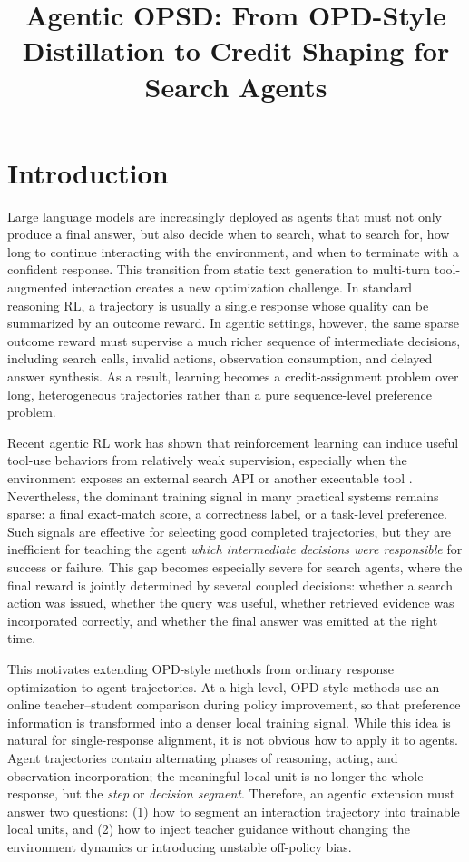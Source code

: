 \documentclass[11pt]{article}
\title{Agentic OPSD: From OPD-Style Distillation to Credit Shaping for Search Agents}
\author{}
\date{}
\begin{document}
\maketitle

\section{Introduction}
Large language models are increasingly deployed as agents that must not only produce a final answer, but also decide when to search, what to search for, how long to continue interacting with the environment, and when to terminate with a confident response. This transition from static text generation to multi-turn tool-augmented interaction creates a new optimization challenge. In standard reasoning RL, a trajectory is usually a single response whose quality can be summarized by an outcome reward. In agentic settings, however, the same sparse outcome reward must supervise a much richer sequence of intermediate decisions, including search calls, invalid actions, observation consumption, and delayed answer synthesis. As a result, learning becomes a credit-assignment problem over long, heterogeneous trajectories rather than a pure sequence-level preference problem.

Recent agentic RL work has shown that reinforcement learning can induce useful tool-use behaviors from relatively weak supervision, especially when the environment exposes an external search API or another executable tool \citep{jin2025search,jin2025empirical,yao2023react,schick2023toolformer}. Nevertheless, the dominant training signal in many practical systems remains sparse: a final exact-match score, a correctness label, or a task-level preference. Such signals are effective for selecting good completed trajectories, but they are inefficient for teaching the agent \emph{which intermediate decisions were responsible} for success or failure. This gap becomes especially severe for search agents, where the final reward is jointly determined by several coupled decisions: whether a search action was issued, whether the query was useful, whether retrieved evidence was incorporated correctly, and whether the final answer was emitted at the right time.

This motivates extending OPD-style methods from ordinary response optimization to agent trajectories. At a high level, OPD-style methods use an online teacher--student comparison during policy improvement, so that preference information is transformed into a denser local training signal. While this idea is natural for single-response alignment, it is not obvious how to apply it to agents. Agent trajectories contain alternating phases of reasoning, acting, and observation incorporation; the meaningful local unit is no longer the whole response, but the \emph{step} or \emph{decision segment}. Therefore, an agentic extension must answer two questions: (1) how to segment an interaction trajectory into trainable local units, and (2) how to inject teacher guidance without changing the environment dynamics or introducing unstable off-policy bias.
\end{document}
